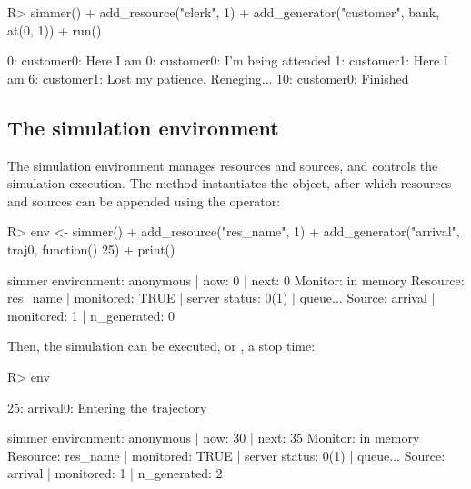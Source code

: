 \documentclass[
  nojss]{jss}
\begin{document}
\begin{CodeChunk}
\begin{CodeInput}
R> simmer() %
+   add_resource("clerk", 1) %
+   add_generator("customer", bank, at(0, 1)) %
+   run() %
\end{CodeInput}
\begin{CodeOutput}
0: customer0: Here I am
0: customer0: I'm being attended
1: customer1: Here I am
6: customer1: Lost my patience. Reneging...
10: customer0: Finished
\end{CodeOutput}
\end{CodeChunk}

\hypertarget{the-simulation-environment}{%
\subsection{The simulation
environment}\label{the-simulation-environment}}

The simulation environment manages resources and sources, and controls
the simulation execution. The  method instantiates the
object, after which resources and sources can be appended using the
\code{\%>\%} operator:

\begin{CodeChunk}
\begin{CodeInput}
R> env <- simmer() %
+   add_resource("res_name", 1) %
+   add_generator("arrival", traj0, function() 25) %
+   print()
\end{CodeInput}
\begin{CodeOutput}
simmer environment: anonymous | now: 0 | next: 0
{ Monitor: in memory }
{ Resource: res_name | monitored: TRUE | server status: 0(1) | queue... }
{ Source: arrival | monitored: 1 | n_generated: 0 }
\end{CodeOutput}
\end{CodeChunk}

Then, the simulation can be executed, or ,  a
stop time:

\begin{CodeChunk}
\begin{CodeInput}
R> env %
\end{CodeInput}
\begin{CodeOutput}
25: arrival0: Entering the trajectory
\end{CodeOutput}
\begin{CodeOutput}
simmer environment: anonymous | now: 30 | next: 35
{ Monitor: in memory }
{ Resource: res_name | monitored: TRUE | server status: 0(1) | queue... }
{ Source: arrival | monitored: 1 | n_generated: 2 }
\end{CodeOutput}
\end{CodeChunk}
\end{document}
